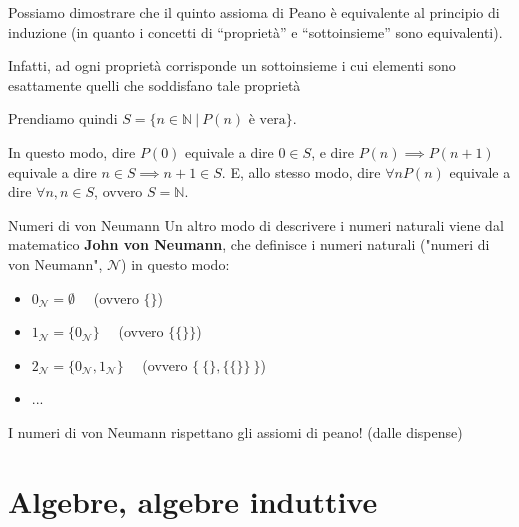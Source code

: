 \documentclass[a4paper,11pt]{report}
\begin{document}
Possiamo dimostrare che il quinto assioma di Peano è equivalente al principio di induzione (in quanto i concetti di ``proprietà'' e ``sottoinsieme'' sono equivalenti).

Infatti, ad ogni proprietà corrisponde un sottoinsieme i cui elementi sono esattamente quelli che soddisfano tale proprietà

Prendiamo quindi \( S = \{n \in \mathbb{N} \ | \ P(n) \text{ è vera}\}\).

In questo modo, dire \( P(0) \) equivale a dire \( 0 \in S \), e dire \( P(n) \implies P(n+1) \) equivale a dire \( n \in S \implies n+1 \in S \). E, allo stesso modo, dire \( \forall n P(n) \) equivale a dire \( \forall n, n \in S\), ovvero \(S = \mathbb{N} \).


\begin{defbox}{Numeri di von Neumann}{}
    Un altro modo di descrivere i numeri naturali viene dal matematico \textbf{John von Neumann}, che definisce i numeri naturali ("numeri di von Neumann", \( \mathcal{N} \)) in questo modo:

    \begin{itemize}
        \item \(  0_\mathcal{N} = \emptyset\)  \ \ {\color{gray}(ovvero \( \{ \} \))}

        \item \( 1_\mathcal{N} = \{ 0_\mathcal{N}\}\) \ \ {\color{gray}(ovvero \( \{ \{\}\} \))}
        \item \( 2_\mathcal{N} = \{ 0_\mathcal{N}, 1_\mathcal{N}\}\) \ \ {\color{gray}(ovvero \( \{ \ \{\}, \{\{\}\} \ \}  \))}
        \item ...

    \end{itemize}

    I numeri di von Neumann rispettano gli assiomi di peano! (dalle dispense)

\end{defbox}

\section{Algebre, algebre induttive}
\end{document}
